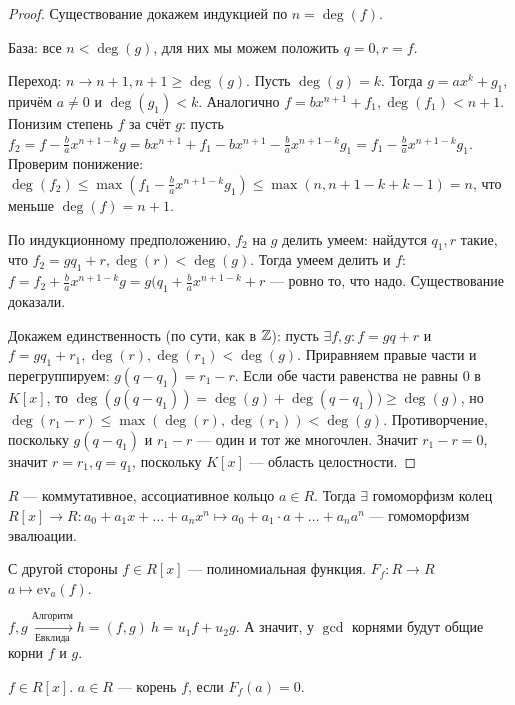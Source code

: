 \begin{proof}
    Существование докажем индукцией по $n = \deg(f)$. 

    База: все $n < \deg(g)$, для них мы можем положить $q = 0, r = f$.

    Переход: $n \to n + 1, n + 1 \ge \deg(g)$. Пусть $\deg(g) = k$. Тогда $g = ax^k + g_1$, причём $a \neq 0$ и $\deg(g_1) < k$. Аналогично $f = bx^{n + 1} + f_1, \deg(f_1) < n + 1$. Понизим степень $f$ за счёт $g$: пусть $f_2 = f - \frac{b}a x^{n+1-k}g = bx^{n+1} + f_1 - bx^{n+1} - \frac{b}a x^{n + 1 - k}g_1 = f_1 - \frac{b}a x^{n + 1 - k}g_1$. Проверим понижение: $\deg(f_2) \le \max(f_1 - \frac{b}a x^{n + 1 - k}g_1) \le \max(n, n + 1 - k + k - 1) = n$, что меньше $\deg(f) = n + 1$. 

    По индукционному предположению, $f_2$ на $g$ делить умеем: найдутся $q_1, r$ такие, что $f_2 = gq_1 + r, \deg(r) < \deg(g)$. Тогда умеем делить и $f$: $f = f_2 + \frac{b}a x^{n + 1 - k}g = g(q_1 + \frac{b}a x^{n + 1 - k} + r$ --- ровно то, что надо. Существование доказали.

    Докажем единственность (по сути, как в $\mathbb{Z}$): пусть $\exists f, g: f = gq+r$ и $f = gq_1 + r_1, \deg(r), \deg(r_1) < \deg(g)$. Приравняем правые части и перегруппируем: $g(q - q_1) = r_1 - r$. Если обе части равенства не равны 0 в $K[x]$, то $\deg(g(q - q_1)) = \deg(g) + \deg(q - q_1)) \ge \deg(g)$, но $\deg(r_1 - r) \le \max(\deg(r), \deg(r_1)) < \deg(g)$. Противорчение, поскольку $g(q - q_1)$ и $r_1 - r$ --- один и тот же многочлен. Значит $r_1 - r = 0$, значит $r = r_1, q = q_1$, поскольку $K[x]$ --- область целостности.
\end{proof}
\begin{consequence}
    $R$ --- коммутативное, ассоциативное кольцо  $a \in R$. Тогда $\exists$ гомоморфизм колец  $R[x] \to R: a_0 + a_1 x + \ldots + a_n x^n \mapsto a_0 + a_1 \cdot a + \ldots + a_n a^n$ --- гомоморфизм эвалюации. 

    С другой стороны $f \in R[x]$ --- полиномиальная функция.  $F_f: R \to R$  $a \mapsto \text{ev}_a(f)$.
\end{consequence}
\begin{consequence}
    $f, g \xrightarrow[\text{Евклида}]{\text{Алгоритм}} h = (f, g)\ h= u_1f + u_2g$. А значит, у $\gcd$ корнями будут общие корни  $f$ и  $g$.
\end{consequence}
\begin{definition}
    $f \in R[x]$.  $a\in R$ --- корень  $f$, если  $F_f(a) = 0$.
\end{definition}
